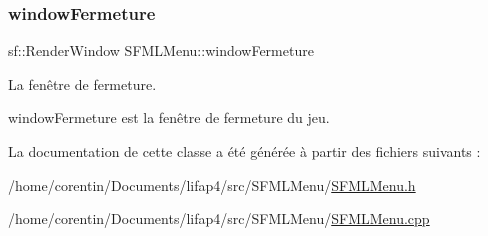 \subsubsection{\texorpdfstring{window\+Fermeture}{windowFermeture}}
{\footnotesize\ttfamily sf\+::\+Render\+Window S\+F\+M\+L\+Menu\+::window\+Fermeture\hspace{0.3cm}{\ttfamily [private]}}



La fenêtre de fermeture. 

window\+Fermeture est la fenêtre de fermeture du jeu. 

La documentation de cette classe a été générée à partir des fichiers suivants \+:\begin{DoxyCompactItemize}
\item 
/home/corentin/\+Documents/lifap4/src/\+S\+F\+M\+L\+Menu/\hyperlink{_s_f_m_l_menu_8h}{S\+F\+M\+L\+Menu.\+h}\item 
/home/corentin/\+Documents/lifap4/src/\+S\+F\+M\+L\+Menu/\hyperlink{_s_f_m_l_menu_8cpp}{S\+F\+M\+L\+Menu.\+cpp}\end{DoxyCompactItemize}

